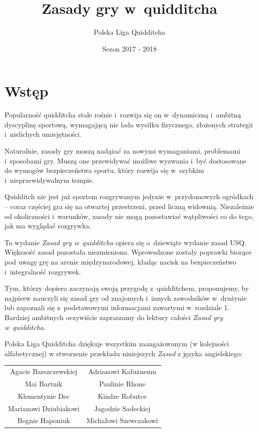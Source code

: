 \documentclass[12pt,a4paper]{article}
\title{Zasady gry w~quidditcha}
\author{Polska Liga Quidditcha}
\date{Sezon 2017 - 2018}
\newcommand{\psection}[1]{
  \section*{#1}
  \addcontentsline{toc}{section}{#1}
}
\begin{document}
\maketitle

\setlength{\parskip}{0ex}

\tableofcontents

\setlength{\parskip}{1ex plus 0.5ex minus 0.2ex}

\newpage

\psection{Wstęp}

Popularność quidditcha stale rośnie i~rozwija się on w~dynamiczną i~ambitną dyscyplinę sportową, wymagającą nie lada wysiłku fizycznego,
złożonych strategii i~nielichych umiejętności.

Naturalnie, zasady gry muszą nadążać za nowymi wymaganiami, problemami i~sposobami gry. Muszą one przewidywać możliwe wyzwania i~być dostosowane
do wymogów bezpieczeństwa sportu, który rozwija się w~szybkim i~nieprzewidywalnym tempie.

Quidditch nie jest już sportem rozgrywanym jedynie w~przydomowych
ogródkach -- coraz częściej gra się na otwartej przestrzeni, przed
liczną widownią. Niezależnie od okoliczności i~warunków, zasady nie mogą
pozostawiać wątpliwości co do tego, jak ma wyglądać rozgrywka.

To wydanie \emph{Zasad gry w~quidditcha} opiera się o~dziewiąte wydanie zasad USQ. Większość zasad pozostała niezmieniona. Wprowadzone zostały poprawki biorące pod uwagę grę na arenie międzynarodowej, kładąc nacisk na bezpieczeństwo i~integralność rozgrywek.

Tym, którzy dopiero zaczynają swoją przygodę z~quidditchem, proponujemy,
by najpierw nauczyli się zasad gry od znajomych i~innych zawodników w~drużynie lub zapoznali się z~podstawowymi informacjami zawartymi w~rozdziale 1. Bardziej ambitnych oczywiście zapraszamy do lektury całości
\emph{Zasad gry w~quidditcha}.

Polska Liga Quidditcha dziękuje wszystkim zaangażowanym (w kolejności alfabetycznej) w stworzenie przekładu niniejszych \emph{Zasad} z języka angielskiego:
\begin{center}
	\begin{tabular}{c c}
		Agacie Barszczewskiej & Adrianowi Kałużnemu \\
		Mai Bartnik & Paulinie Rhone \\
		Klementynie Dec & Kindze Robutce \\
		Marianowi Dziubiakowi & Jagodzie Sadeckiej \\
		Bognie Haponiuk & Michałowi Szewczakowi
	\end{tabular}
\end{center}
\end{document}

